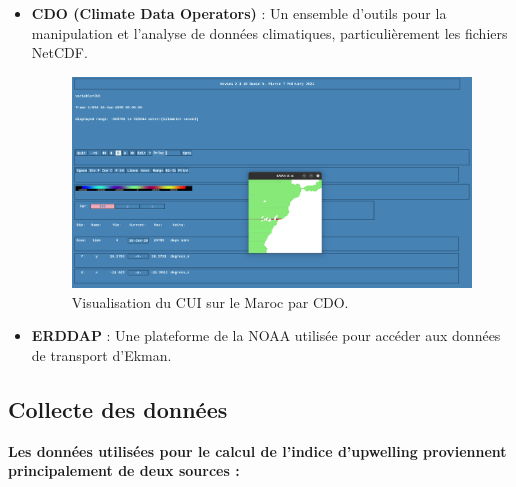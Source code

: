 \begin{itemize}
    
    \item \textbf{CDO (Climate Data Operators)} : Un ensemble d’outils pour la manipulation et l’analyse de données climatiques, particulièrement les fichiers NetCDF.

\begin{figure}[H]
\includegraphics[scale=0.2]{cdo.png}
\caption{Visualisation du CUI sur le Maroc par CDO.}
\end{figure}
    

    
    
    \item \textbf{ERDDAP} : Une plateforme de la NOAA utilisée pour accéder aux données de transport d'Ekman.
\end{itemize}

\subsection{Collecte des données}
\textbf{Les données utilisées pour le calcul de l'indice d'upwelling proviennent principalement de deux sources :} \\

